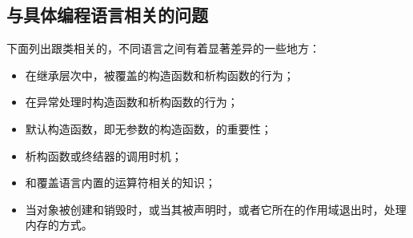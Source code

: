 \documentclass{article}
\begin{document}
\subsection{与具体编程语言相关的问题}
下面列出跟类相关的，不同语言之间有着显著差异的一些地方：
\begin{itemize}
    \item 在继承层次中，被覆盖的构造函数和析构函数的行为；
    \item 在异常处理时构造函数和析构函数的行为；
    \item 默认构造函数，即无参数的构造函数，的重要性；
    \item 析构函数或终结器的调用时机；
    \item 和覆盖语言内置的运算符相关的知识；
    \item 当对象被创建和销毁时，或当其被声明时，或者它所在的作用域退出时，处理内存的方式。
\end{itemize}
\end{document}
